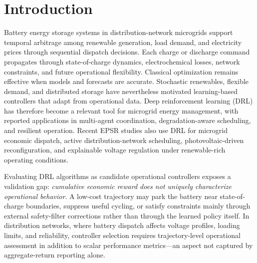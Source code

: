 \section{Introduction}
\label{sec:introduction}

Battery energy storage systems in distribution-network microgrids support temporal arbitrage among renewable generation, load demand, and electricity prices through sequential dispatch decisions. Each charge or discharge command propagates through state-of-charge dynamics, electrochemical losses, network constraints, and future operational flexibility\cite{nakabi2021segan,zhang2023multiagentECM,monfaredi2023multiagent}. Classical optimization remains effective when models and forecasts are accurate. Stochastic renewables, flexible demand, and distributed storage have nevertheless motivated learning-based controllers that adapt from operational data\cite{wang2023collaborative,lin2024coordinated,li2024deep,raj2024reinforcement,li2025optimizing,omar2025hierarchical,zhang2026safeTCE}. Deep reinforcement learning (DRL) has therefore become a relevant tool for microgrid energy management, with reported applications in multi-agent coordination\cite{XU2023106774,zhang2024energy}, degradation-aware scheduling\cite{li2025battery,park2026worldmodel}, and resilient operation\cite{delavari2024rlRobust,momen2024resilience,amiri2026explainableECM}. Recent EPSR studies also use DRL for microgrid economic dispatch, active distribution-network scheduling, photovoltaic-driven reconfiguration, and explainable voltage regulation under renewable-rich operating conditions\cite{liu2025epsrInfoDRL,xue2024epsrSafeDRL,wu2025epsrHierarchical,zhang2025epsrExplainable}.

Evaluating DRL algorithms as candidate operational controllers exposes a validation gap: \emph{cumulative economic reward does not uniquely characterize operational behavior}. A low-cost trajectory may park the battery near state-of-charge boundaries, suppress useful cycling, or satisfy constraints mainly through external safety-filter corrections rather than through the learned policy itself. In distribution networks, where battery dispatch affects voltage profiles, loading limits, and reliability, controller selection requires trajectory-level operational assessment in addition to scalar performance metrics---an aspect not captured by aggregate-return reporting alone\cite{henderson2018deepRLmatters,agarwal2021statistical}.

